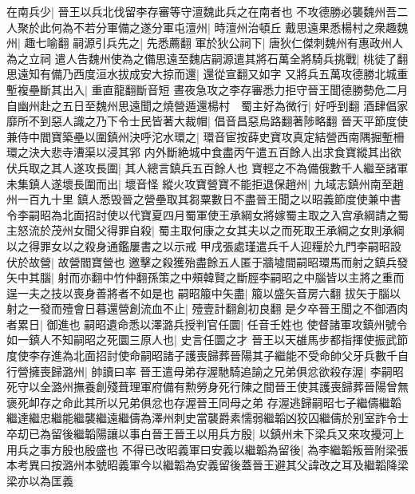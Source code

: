 在南兵少|{
	晉王以兵北伐留李存審等守澶魏此兵之在南者也}
不攻德勝必襲魏州吾二人聚於此何為不若分軍備之遂分軍屯澶州|{
	時澶州治頓丘}
戴思遠果悉楊村之衆趣魏州|{
	趣七喻翻}
嗣源引兵先之|{
	先悉薦翻}
軍於狄公祠下|{
	唐狄仁傑刺魏州有惠政州人為之立祠}
遣人告魏州使為之備思遠至魏店嗣源遣其將石萬全將騎兵挑戰|{
	桃徒了翻}
思遠知有備乃西度洹水拔成安大掠而還|{
	還從宣翻又如字}
又將兵五萬攻德勝北城重塹複壘斷其出入|{
	重直龍翻斷音短}
晝夜急攻之李存審悉力拒守晉王聞德勝勢危二月自幽州赴之五日至魏州思遠聞之燒營遁還楊村　蜀主好為微行|{
	好呼到翻}
酒肆倡家靡所不到惡人識之乃下令士民皆著大裁帽|{
	倡音昌惡烏路翻著陟略翻}
晉天平節度使兼侍中閻寶築壘以圍鎮州決呼沱水環之|{
	環音宦按薛史寶攻真定結營西南隅掘塹柵環之決大悲寺漕渠以浸其郛}
内外斷絶城中食盡丙午遣五百餘人出求食寶縱其出欲伏兵取之其人遂攻長圍|{
	其人總言鎮兵五百餘人也}
寶輕之不為備俄數千人繼至諸軍未集鎮人遂壞長圍而出|{
	壞音怪}
縱火攻寶營寶不能拒退保趙州|{
	九域志鎮州南至趙州一百九十里}
鎮人悉毁晉之營壘取其芻粟數日不盡晉王聞之以昭義節度使兼中書令李嗣昭為北面招討使以代寶夏四月蜀軍使王承綱女將嫁蜀主取之入宫承綱請之蜀主怒流於茂州女聞父得罪自殺|{
	蜀主取何康之女其夫以之而死取王承綱之女則承綱以之得罪女以之殺身通鑑屢書之以示戒}
甲戌張處瑾遣兵千人迎糧於九門李嗣昭設伏於故營|{
	故營閻寶營也}
邀擊之殺獲殆盡餘五人匿于牆墟間嗣昭環馬而射之鎮兵發矢中其腦|{
	射而亦翻中竹仲翻孫策之中頰韓賢之斷脛李嗣昭之中腦皆以主將之重而逞一夫之技以喪身善將者不如是也}
嗣昭箙中矢盡|{
	箙以盛矢音房六翻}
拔矢于腦以射之一發而殪會日暮還營創流血不止|{
	殪壹計翻創初良翻}
是夕卒晉王聞之不御酒肉者累日|{
	御進也}
嗣昭遺命悉以澤潞兵授判官任圜|{
	任音壬姓也}
使督諸軍攻鎮州號令如一鎮人不知嗣昭之死圜三原人也|{
	史言任圜之才}
晉王以天䧺馬步都指揮使振武節度使李存進為北面招討使命嗣昭諸子護喪歸葬晉陽其子繼能不受命帥父牙兵數千自行營擁喪歸潞州|{
	帥讀曰率}
晉王遣母弟存渥馳騎追諭之兄弟俱忿欲殺存渥|{
	李嗣昭死守以全潞州撫養創殘葺理軍府備有勲勞身死行陳之間晉王使其護喪歸葬晉陽曾無褒死卹存之命此其所以兄弟俱忿也存渥晉王同母之弟}
存渥逃歸嗣昭七子繼儔繼韜繼達繼忠繼能繼襲繼遠繼儔為澤州刺史當襲爵素懦弱繼韜凶狡囚繼儔於别室詐令士卒刧已為留後繼韜陽讓以事白晉王晉王以用兵方殷|{
	以鎮州未下梁兵又來攻擾河上用兵之事方殷也殷盛也}
不得已改昭義軍曰安義以繼韜為留後|{
	為李繼韜叛晉附梁張本考異曰按潞州本號昭義軍今以繼韜為安義留後蓋晉王避其父諱改之耳及繼韜降梁梁亦以為匡義}


